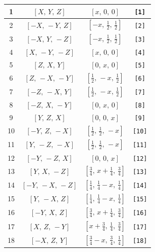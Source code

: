 \documentclass[fleqn,8pt]{jsarticle}
\begin{document}
\begin{longtable}{cccc}
1 & $\left[ X,\, Y,\, Z \right]$ & $\left[ x,\, 0,\, 0 \right]$ & {\tt [1]} \\ \hline
2 & $\left[ - X,\, - Y,\, Z \right]$ & $\left[ - x,\, \frac{1}{2},\, \frac{1}{2} \right]$ & {\tt [2]} \\ \hline
3 & $\left[ - X,\, Y,\, - Z \right]$ & $\left[ - x,\, \frac{1}{2},\, \frac{1}{2} \right]$ & {\tt [3]} \\ \hline
4 & $\left[ X,\, - Y,\, - Z \right]$ & $\left[ x,\, 0,\, 0 \right]$ & {\tt [4]} \\ \hline
5 & $\left[ Z,\, X,\, Y \right]$ & $\left[ 0,\, x,\, 0 \right]$ & {\tt [5]} \\ \hline
6 & $\left[ Z,\, - X,\, - Y \right]$ & $\left[ \frac{1}{2},\, - x,\, \frac{1}{2} \right]$ & {\tt [6]} \\ \hline
7 & $\left[ - Z,\, - X,\, Y \right]$ & $\left[ \frac{1}{2},\, - x,\, \frac{1}{2} \right]$ & {\tt [7]} \\ \hline
8 & $\left[ - Z,\, X,\, - Y \right]$ & $\left[ 0,\, x,\, 0 \right]$ & {\tt [8]} \\ \hline
9 & $\left[ Y,\, Z,\, X \right]$ & $\left[ 0,\, 0,\, x \right]$ & {\tt [9]} \\ \hline
10 & $\left[ - Y,\, Z,\, - X \right]$ & $\left[ \frac{1}{2},\, \frac{1}{2},\, - x \right]$ & {\tt [10]} \\ \hline
11 & $\left[ Y,\, - Z,\, - X \right]$ & $\left[ \frac{1}{2},\, \frac{1}{2},\, - x \right]$ & {\tt [11]} \\ \hline
12 & $\left[ - Y,\, - Z,\, X \right]$ & $\left[ 0,\, 0,\, x \right]$ & {\tt [12]} \\ \hline
13 & $\left[ Y,\, X,\, - Z \right]$ & $\left[ \frac{3}{4},\, x + \frac{1}{4},\, \frac{3}{4} \right]$ & {\tt [13]} \\ \hline
14 & $\left[ - Y,\, - X,\, - Z \right]$ & $\left[ \frac{1}{4},\, \frac{1}{4} - x,\, \frac{1}{4} \right]$ & {\tt [14]} \\ \hline
15 & $\left[ Y,\, - X,\, Z \right]$ & $\left[ \frac{1}{4},\, \frac{1}{4} - x,\, \frac{1}{4} \right]$ & {\tt [15]} \\ \hline
16 & $\left[ - Y,\, X,\, Z \right]$ & $\left[ \frac{3}{4},\, x + \frac{1}{4},\, \frac{3}{4} \right]$ & {\tt [16]} \\ \hline
17 & $\left[ X,\, Z,\, - Y \right]$ & $\left[ x + \frac{3}{4},\, \frac{1}{4},\, \frac{3}{4} \right]$ & {\tt [17]} \\ \hline
18 & $\left[ - X,\, Z,\, Y \right]$ & $\left[ \frac{3}{4} - x,\, \frac{3}{4},\, \frac{1}{4} \right]$ & {\tt [18]} \\ \hline

\end{longtable}
\end{document}
